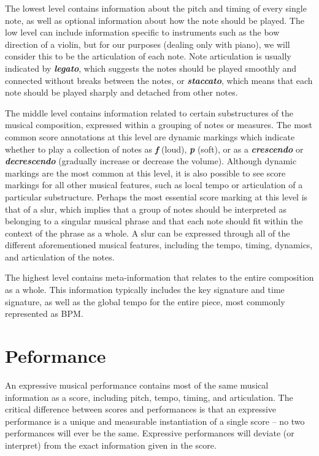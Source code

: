 \newcommand{\mnot}[1]{\textbf{\emph{#1}}}

The lowest level contains information about the pitch and timing of every single note, as well as optional information about how the note should be played. The low level can include information specific to instruments such as the bow direction of a violin, but for our purposes (dealing only with piano), we will consider this to be the articulation of each note. Note articulation is usually indicated by \mnot{legato}, which suggests the notes should be played smoothly and connected without breaks between the notes, or \mnot{staccato}, which means that each note should be played sharply and detached from other notes. 

The middle level contains information related to certain substructures of the musical composition, expressed within a grouping of notes or measures. The most common score annotations at this level are dynamic markings which indicate whether to play a collection of notes as \mnot{f} (loud), \mnot{p} (soft), or as a \mnot{crescendo} or \mnot{decrescendo} (gradually increase or decrease the volume). %
Although dynamic markings are the most common at this level, it is also possible to see score markings for all other musical features, such as local tempo or articulation of a particular substructure. Perhaps the most essential score marking at this level is that of a slur, which implies that a group of notes should be interpreted as belonging to a singular musical phrase and that each note should fit within the context of the phrase as a whole. A slur can be expressed through all of the different aforementioned musical features, including the tempo, timing, dynamics, and articulation of the notes.

The highest level contains meta-information that relates to the entire composition as a whole. This information typically includes the key signature and time signature, as well as the global tempo for the entire piece, most commonly represented as BPM. 


\section{Peformance}\label{sec:performance}
An expressive musical performance contains most of the same musical information as a score, including pitch, tempo, timing, and articulation. The critical difference between scores and performances is that an expressive performance is a unique and measurable instantiation of a single score -- no two performances will ever be the same. Expressive performances will deviate (or interpret) from the exact information given in the score. 

